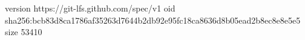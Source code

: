 version https://git-lfs.github.com/spec/v1
oid sha256:bcb83d8ca1786af35263d7644b2db92e95fc18ca8636d8b05ead2b8ec8e8e5e5
size 53410
